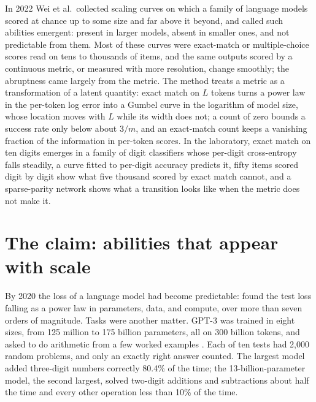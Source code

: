 \newcommand{\emergenceEM}{\mathrm{EM}}
\newcommand{\emergenceeff}{\mathrm{eff}}
\newcommand{\emergenceKL}{\mathrm{KL}}
\begin{refsection}

\begin{chaptersummary}
In 2022 Wei et al.\ collected scaling curves on which a family of language models scored at chance up to some size and far above it beyond, and called such abilities emergent: present in larger models, absent in smaller ones, and not predictable from them. Most of these curves were exact-match or multiple-choice scores read on tens to thousands of items, and the same outputs scored by a continuous metric, or measured with more resolution, change smoothly; the abruptness came largely from the metric. The method treats a metric as a transformation of a latent quantity: exact match on $L$ tokens turns a power law in the per-token log error into a Gumbel curve in the logarithm of model size, whose location moves with $L$ while its width does not; a count of zero bounds a success rate only below about $3/m$, and an exact-match count keeps a vanishing fraction of the information in per-token scores. In the laboratory, exact match on ten digits emerges in a family of digit classifiers whose per-digit cross-entropy falls steadily, a curve fitted to per-digit accuracy predicts it, fifty items scored digit by digit show what five thousand scored by exact match cannot, and a sparse-parity network shows what a transition looks like when the metric does not make it.
\end{chaptersummary}

\section{The claim: abilities that appear with scale}\label{sec:emergence:claim}

By 2020 the loss of a language model had become predictable: \textcite{KaplanEtAl2020} found the test loss falling as a power law in parameters, data, and compute, over more than seven orders of magnitude. Tasks were another matter. GPT-3 was trained in eight sizes, from 125 million to 175 billion parameters, all on 300 billion tokens, and asked to do arithmetic from a few worked examples \parencite{BrownEtAl2020}. Each of ten tests had 2,000 random problems, and only an exactly right answer counted. The largest model added three-digit numbers correctly 80.4\% of the time; the 13-billion-parameter model, the second largest, solved two-digit additions and subtractions about half the time and every other operation less than 10\% of the time.


\end{refsection}
